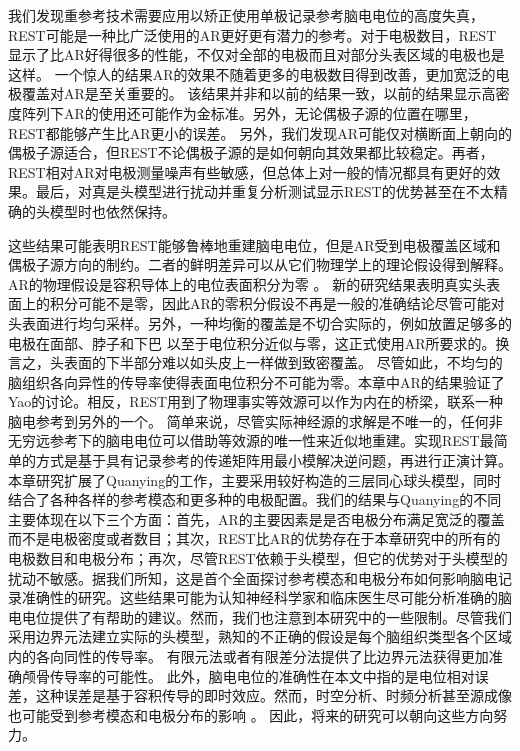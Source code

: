 我们发现重参考技术需要应用以矫正使用单极记录参考脑电电位的高度失真，REST可能是一种比广泛使用的AR更好更有潜力的参考。对于电极数目，REST 显示了比AR好得很多的性能，不仅对全部的电极而且对部分头表区域的电极也是这样。 一个惊人的结果AR的效果不随着更多的电极数目得到改善，更加宽泛的电极覆盖对AR是至关重要的。 该结果并非和以前的结果一致，以前的结果显示高密度阵列下AR的使用还可能作为金标准。另外，无论偶极子源的位置在哪里，REST都能够产生比AR更小的误差。 另外，我们发现AR可能仅对横断面上朝向的偶极子源适合，但REST不论偶极子源的是如何朝向其效果都比较稳定。再者，REST相对AR对电极测量噪声有些敏感，但总体上对一般的情况都具有更好的效果。最后，对真是头模型进行扰动并重复分析测试显示REST的优势甚至在不太精确的头模型时也依然保持。

这些结果可能表明REST能够鲁棒地重建脑电电位，但是AR受到电极覆盖区域和偶极子源方向的制约。二者的鲜明差异可以从它们物理学上的理论假设得到解释。
AR的物理假设是容积导体上的电位表面积分为零
。
新的研究结果表明真实头表面上的积分可能不是零，因此AR的零积分假设不再是一般的准确结论尽管可能对头表面进行均匀采样。另外，一种均衡的覆盖是不切合实际的，例如放置足够多的电极在面部、脖子和下巴 以至于电位积分近似与零，这正式使用AR所要求的。换言之，头表面的下半部分难以如头皮上一样做到致密覆盖。 尽管如此，不均匀的脑组织各向异性的传导率使得表面电位积分不可能为零。本章中AR的结果验证了Yao的讨论。相反，REST用到了物理事实等效源可以作为内在的桥梁，联系一种脑电参考到另外的一个。 简单来说，尽管实际神经源的求解是不唯一的，任何非无穷远参考下的脑电电位可以借助等效源的唯一性来近似地重建。实现REST最简单的方式是基于具有记录参考的传递矩阵用最小模解决逆问题，再进行正演计算。 本章研究扩展了Quanying的工作，主要采用较好构造的三层同心球头模型，同时结合了各种各样的参考模态和更多种的电极配置。我们的结果与Quanying的不同主要体现在以下三个方面：首先，AR的主要因素是是否电极分布满足宽泛的覆盖而不是电极密度或者数目；其次，REST比AR的优势存在于本章研究中的所有的电极数目和电极分布；再次，尽管REST依赖于头模型，但它的优势对于头模型的扰动不敏感。据我们所知，这是首个全面探讨参考模态和电极分布如何影响脑电记录准确性的研究。这些结果可能为认知神经科学家和临床医生尽可能分析准确的脑电电位提供了有帮助的建议。然而，我们也注意到本研究中的一些限制。尽管我们采用边界元法建立实际的头模型，熟知的不正确的假设是每个脑组织类型各个区域内的各向同性的传导率。 有限元法或者有限差分法提供了比边界元法获得更加准确颅骨传导率的可能性。 此外，脑电电位的准确性在本文中指的是电位相对误差，这种误差是基于容积传导的即时效应。然而，时空分析、时频分析甚至源成像也可能受到参考模态和电极分布的影响 。 因此，将来的研究可以朝向这些方向努力。
